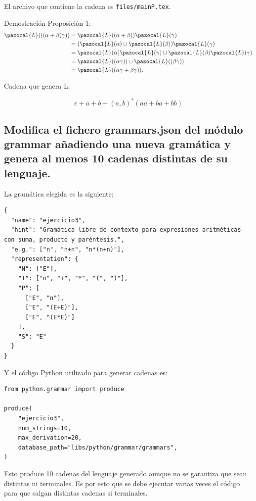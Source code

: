 \documentclass[10pt]{article}
\newcommand{\Lb}{\pazocal{L}}
\begin{document}
El archivo que contiene la cadena es \texttt{files/mainP.tex}.

Demostración Proposición 1:
\begin{align*}
\Lb(((\alpha+\beta)\gamma))
  &= \Lb((\alpha+\beta))\Lb(\gamma) \\
  &= (\Lb(\alpha)\cup \Lb(\beta))\Lb(\gamma) \\
  &= \Lb(\alpha)\Lb(\gamma)\cup \Lb(\beta)\Lb(\gamma) \\
  &= \Lb((\alpha\gamma))\cup \Lb((\beta\gamma)) \\
  &= \Lb((\alpha\gamma+\beta\gamma)).
\end{align*}


Cadena que genera L:
\begin{center}
  \[
  \varepsilon + a + b + (a, b)^*(aa+ba+bb)
  \]
\end{center}

\newpage
\subsection{Modifica el fichero grammars.json del módulo grammar añadiendo una
nueva gramática y genera al menos 10 cadenas distintas de su lenguaje.}

La gramática elegida es la siguiente:

\begin{verbatim}
{
  "name": "ejercicio3",
  "hint": "Gramática libre de contexto para expresiones aritméticas con suma, producto y paréntesis.",
  "e.g.": ["n", "n+n", "n*(n+n)"],
  "representation": {
    "N": ["E"],
    "T": ["n", "+", "*", "(", ")"],
    "P": [
      ["E", "n"],
      ["E", "(E+E)"],
      ["E", "(E*E)"]
    ],
    "S": "E"
  }
}
\end{verbatim}

Y el código Python utilizado para generar cadenas es:

\begin{verbatim}
from python.grammar import produce

produce(
    "ejercicio3",
    num_strings=10,
    max_derivation=20,
    database_path="libs/python/grammar/grammars",
)

\end{verbatim}
Esto produce 10 cadenas del lenguaje generado aunque no se garantiza que
sean distintas ni terminales. Es por esto que se debe ejecutar varias veces
el código para que salgan distintas cadenas si terminales.
\newline
\end{document}
